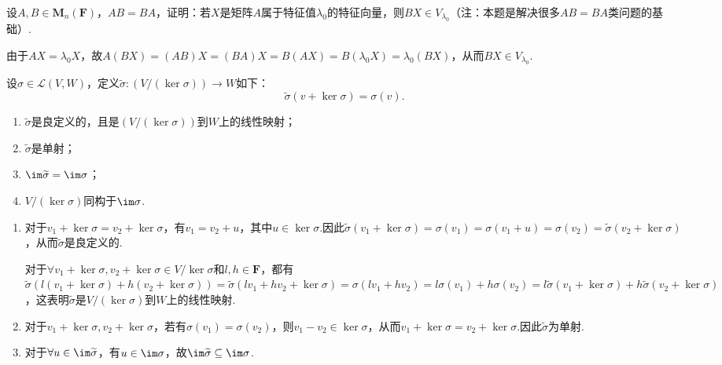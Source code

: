 \begin{exercise}
\begin{exgroup}
        \item 设$A,B\in \mathbf{M}_n(\mathbf{F})$，$AB=BA$，证明：若$X$是矩阵$A$属于特征值$\lambda_0$的特征向量，则$BX\in V_{\lambda_0}$（注：本题是解决很多$AB=BA$类问题的基础）.
        \begin{answer}
            由于$AX=\lambda_0 X$，故$A(BX)=(AB)X=(BA)X=B(AX)=B(\lambda_0X)=\lambda_0(BX)$，从而$BX\in V_{\lambda_0}$.
        \end{answer}
    \end{exgroup}

    \begin{exgroup}
        \item 设$\sigma\in \mathcal{L}(V,W)$，定义$\widetilde{\sigma}:(V/(\ker \sigma))\to W$如下：
        \[\widetilde{\sigma}(v+\ker\sigma)=\sigma(v).\]
        \begin{enumerate}
            \item $\widetilde{\sigma}$是良定义的，且是$(V/(\ker \sigma))$到$W$上的线性映射；

            \item $\widetilde{\sigma}$是单射；

            \item $\im \widetilde{\sigma}=\im \sigma$；

            \item $V/(\ker \sigma)$同构于$\im \sigma$.
        \end{enumerate}
        \begin{answer}
            \begin{enumerate}
                \item 对于$v_1+\ker\sigma=v_2+\ker\sigma$，有$v_1=v_2+u$，其中$u\in\ker\sigma$.因此$\widetilde{\sigma}(v_1+\ker\sigma)=\sigma(v_1)=\sigma(v_1+u)=\sigma(v_2)=\widetilde{\sigma}(v_2+\ker\sigma)$，从而$\widetilde{\sigma}$是良定义的.

                对于$\forall v_1+\ker\sigma,v_2+\ker\sigma \in V/\ker\sigma$和$l,h\in \mathbf{F}$，都有$\widetilde{\sigma}(l(v_1+\ker\sigma)+h(v_2+\ker\sigma))=\widetilde{\sigma}(lv_1+hv_2+\ker\sigma)=\sigma(lv_1+hv_2)=l\sigma(v_1)+h\sigma(v_2)=l\widetilde{\sigma}(v_1+\ker\sigma)+h\widetilde{\sigma}(v_2+\ker\sigma)$，这表明$\widetilde{\sigma}$是$V/(\ker\sigma)$到$W$上的线性映射.
                \item 对于$v_1+\ker\sigma,v_2+\ker\sigma$，若有$\sigma(v_1)=\sigma(v_2)$，则$v_1-v_2\in \ker\sigma$，从而$v_1+\ker\sigma=v_2+\ker\sigma$.因此$\widetilde{\sigma}$为单射.
                \item 对于$\forall u\in \im\widetilde{\sigma}$，有$u \in \im\sigma$，故$\im \widetilde{\sigma} \subseteq \im\sigma$.


\end{enumerate}
\end{answer}
\end{exgroup}
\end{exercise}
